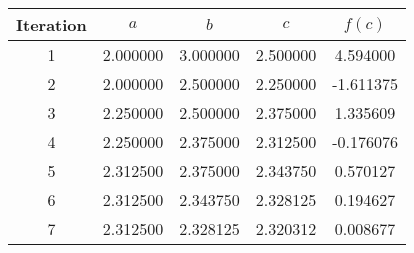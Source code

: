 \begin{tabular}{|c|c|c|c|c|}
\hline
Iteration & $a$ & $b$ & $c$ & $f(c)$ \\
\hline
1 & 2.000000 & 3.000000 & 2.500000 & 4.594000 \\
\hline
2 & 2.000000 & 2.500000 & 2.250000 & -1.611375 \\
\hline
3 & 2.250000 & 2.500000 & 2.375000 & 1.335609 \\
\hline
4 & 2.250000 & 2.375000 & 2.312500 & -0.176076 \\
\hline
5 & 2.312500 & 2.375000 & 2.343750 & 0.570127 \\
\hline
6 & 2.312500 & 2.343750 & 2.328125 & 0.194627 \\
\hline
7 & 2.312500 & 2.328125 & 2.320312 & 0.008677 \\
\hline
\end{tabular}